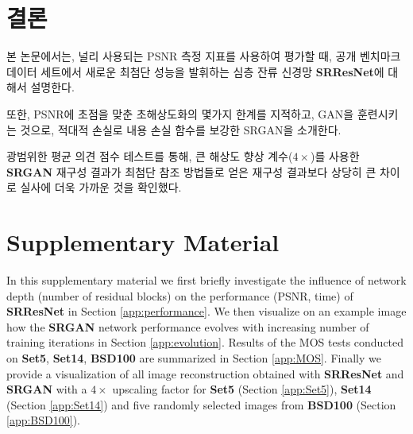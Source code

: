 \documentclass[10pt,twocolumn,letterpaper]{article}
\newcommand{\kor}[1]{#1}
\newcommand{\eng}[1]{}
\begin{document}
\section{\eng{Conclusion}\kor{결론}}
\label{sec:conclusion}
\eng{
We have described a deep residual network \textbf{SRResNet} that sets a new state of the art on public benchmark datasets when evaluated with the widely used \ac{PSNR} measure.
}\kor{
본 논문에서는, 널리 사용되는 \ac{PSNR} 측정 지표를 사용하여 평가할 때, 공개 벤치마크 데이터 세트에서 새로운 최첨단 성능을 발휘하는 심층 잔류 신경망 \textbf{SRResNet}에 대해서 설명한다.
} \eng{
We have highlighted some limitations of this \ac{PSNR}-focused image super-resolution and introduced \textbf{SRGAN}, which augments the content loss function with an adversarial loss by training a \ac{GAN}.
}\kor{
또한, \ac{PSNR}에 초점을 맞춘 초해상도화의 몇가지 한계를 지적하고, \ac{GAN}을 훈련시키는 것으로, 적대적 손실로 내용 손실 함수를 보강한 \ac{SRGAN}을 소개한다.
}\eng{
Using extensive \ac{MOS} testing, we have confirmed that \textbf{SRGAN} reconstructions for large upscaling factors ($4\times$) are, by a considerable margin, more photo-realistic than reconstructions obtained with state-of-the-art reference methods.
}\kor{
광범위한 \ac{평균 의견 점수} 테스트를 통해, 큰 해상도 향상 계수($4\times$)를 사용한 \textbf{SRGAN} 재구성 결과가 최첨단 참조 방법들로 얻은 재구성 결과보다 상당히 큰 차이로 실사에 더욱 가까운 것을 확인했다.
}

{\footnotesize


}
\clearpage
\setcounter{section}{0}
\renewcommand{\thesection}{\Alph{section}}
\onecolumn
\section{Supplementary Material}
In this supplementary material we first briefly investigate the influence of network depth (number of residual blocks) on the performance (PSNR, time) of \textbf{SRResNet} in Section \ref{app:performance}. We then visualize on an example image how the \textbf{SRGAN} network performance evolves with increasing number of training iterations in Section \ref{app:evolution}. Results of the \ac{MOS} tests conducted on \textbf{Set5}, \textbf{Set14}, \textbf{BSD100} are summarized in Section \ref{app:MOS}. Finally we provide a visualization of all image reconstruction obtained with \textbf{SRResNet} and \textbf{SRGAN} with a $4\times$ upscaling factor for \textbf{Set5} (Section \ref{app:Set5}), \textbf{Set14} (Section \ref{app:Set14}) and five randomly selected images from \textbf{BSD100} (Section \ref{app:BSD100}).\\
\end{document}
